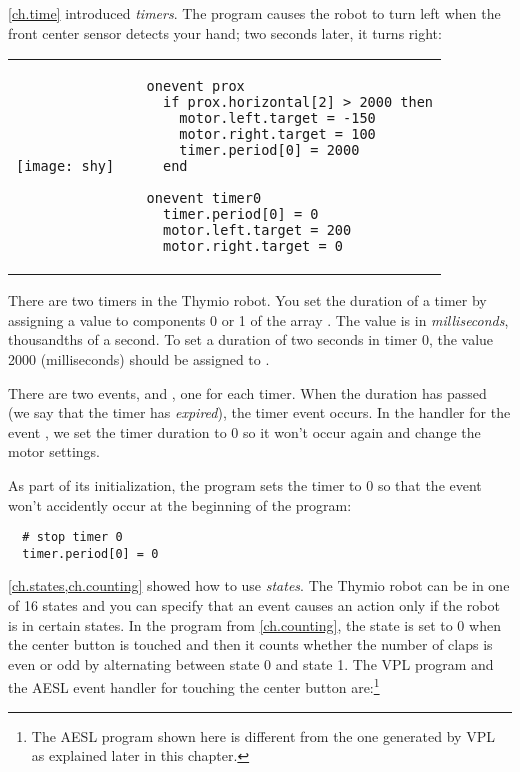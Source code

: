 
\cref{ch.time} introduced \emph{timers}. The program
 causes the robot to turn left when the front center sensor
detects your hand; two seconds later, it turns right:

\begin{center}
\begin{tabular}{ll}
\texttt{[image: shy]} &
\begin{minipage}[b]{.5\textwidth}
\begin{footnotesize}
\begin{verbatim}
  onevent prox
    if prox.horizontal[2] > 2000 then
      motor.left.target = -150
      motor.right.target = 100
      timer.period[0] = 2000
    end
  
  onevent timer0
    timer.period[0] = 0
    motor.left.target = 200
    motor.right.target = 0
\end{verbatim}
\end{footnotesize}
\end{minipage}
\end{tabular}
\end{center}

There are two timers in the Thymio robot. You set the duration of a
timer by assigning a value to components 0 or 1 of the array
. The value is in \emph{milliseconds}, thousandths of a
second. To set a duration of two seconds in timer 0, the value 2000
(milliseconds) should be assigned to .

There are two events,  and , one for each timer.
When the duration has passed (we say that the timer has \emph{expired}),
the timer event occurs. In the handler for the event , we set
the timer duration to 0 so it won't occur again and change the motor
settings.

As part of its initialization, the program sets the timer to 0 so that
the event won't accidently occur at the beginning of the program:

\begin{footnotesize}
\begin{verbatim}
  # stop timer 0
  timer.period[0] = 0
\end{verbatim}
\end{footnotesize}



\cref{ch.states,ch.counting} showed how to use \emph{states}. The
Thymio robot can be in one of 16 states and you can specify that an
event causes an action only if the robot is in certain states. In the
program  from \cref{ch.counting}, the state is set to 0 when
the center button is touched and then it counts whether the number of
claps is even or odd by alternating between state 0 and state 1. The VPL
program and the AESL event handler for touching the center button
are:\footnote{The AESL program shown here is different from the one
generated by VPL as explained later in this chapter.}

